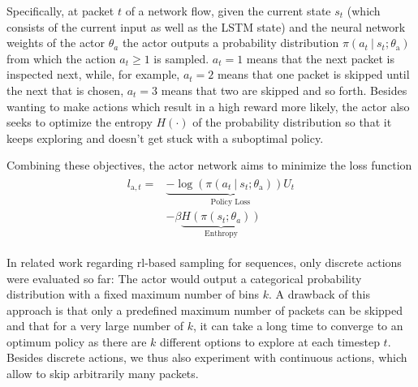 \documentclass[conference]{IEEEtran}
\newcommand\givenbase[1][]{\:#1\lvert\:}
\let\given\givenbase
\begin{document}
Specifically, at packet $t$ of a network flow, given the current state $s_t$ (which consists of the current input as well as the LSTM state) and the neural network weights of the actor $\theta_a$ the actor outputs a probability distribution $\pi \left( a_t \given s_t ; \theta_\text{a} \right)$ from which the action $a_t \ge 1$ is sampled. $a_t=1$ means that the next packet is inspected next, while, for example, $a_t=2$ means that one packet is skipped until the next that is chosen, $a_t = 3$ means that two are skipped and so forth. Besides wanting to make actions which result in a high reward more likely, the actor also seeks to optimize the entropy $H(\cdot)$ of the probability distribution so that it keeps exploring and doesn't get stuck with a suboptimal policy.

Combining these objectives, the actor network aims to minimize the loss function
\begin{align}
\begin{split}
l_{\text{a},t} =& \underbrace{ -\log \left( \pi \left( a_t \given s_t ; \theta_\text{a} \right) \right) U_t}_{\text{Policy Loss}} \\
&- \beta \underbrace{H\left( \pi\left( s_t; \theta_a \right)\right) }_{\text{Enthropy}}
\end{split}\label{eq:actor}
\end{align}


In related work regarding \gls{rl}-based sampling for sequences, only discrete actions were evaluated so far: The actor would output a categorical probability distribution with a fixed maximum number of bins $k$. A drawback of this approach is that only a predefined maximum number of packets can be skipped and that for a very large number of $k$, it can take a long time to converge to an optimum policy as there are $k$ different options to explore at each timestep $t$. Besides discrete actions, we thus also experiment with continuous actions, which allow to skip arbitrarily many packets.
\end{document}
